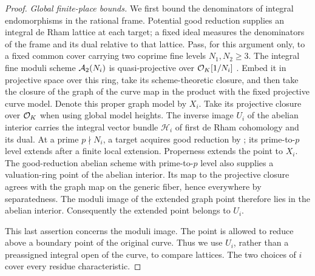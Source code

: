 \begin{proof}
\emph{Global finite-place bounds.}
We first bound the denominators of integral endomorphisms in the rational
frame.  Potential good reduction supplies an integral de Rham lattice at
each target; a fixed ideal measures the denominators of the frame and
its dual relative to that lattice.  Pass,
for this argument only, to a fixed common cover carrying two coprime
fine levels $N_1,N_2\ge3$.  The integral fine moduli scheme
$\mathcal A_2(N_i)$ is quasi-projective over $\mathcal O_K[1/N_i]$
\cite[Chapter~I, Theorem~1.4 and Section~1.7]{Chai1985}.
Embed it in projective space over this ring, take its scheme-theoretic
closure, and then take the closure of the graph of the curve map in
the product with the fixed projective curve model.
Denote this proper graph
model by $X_i$.  Take its projective closure over $\mathcal O_K$ when
using global model heights.  The inverse image $U_i$ of the abelian interior
carries the integral vector bundle $\mathcal H_i$ of first de Rham
cohomology and its dual.  At a prime $p\nmid N_i$, a target acquires
good reduction by ; its prime-to-$p$ level
extends after a finite local extension.  Properness extends the
point to $X_i$.  The good-reduction abelian scheme with prime-to-$p$
level also supplies a valuation-ring point of the abelian interior.
Its map to the projective closure agrees with the graph map on the
generic fiber, hence everywhere by separatedness.  The moduli image
of the extended graph point therefore lies in the abelian interior.
Consequently the extended point belongs to $U_i$.

This last assertion concerns the moduli image.  The point is allowed
to reduce above a boundary point of the original curve.  Thus we use
$U_i$, rather than a preassigned integral open of the curve, to
compare lattices.  The two choices of $i$ cover every residue
characteristic.


\end{proof}
